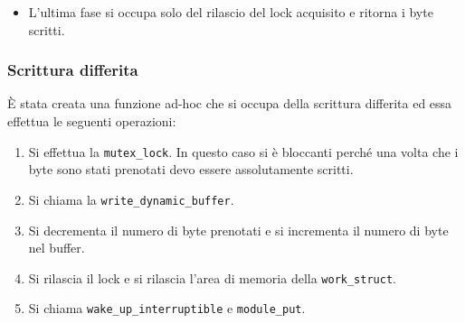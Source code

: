 \documentclass[oneside]{article}
\begin{document}
\begin{itemize}
\begin{itemize}
\begin{enumerate}
\item Viene incrementato il numero di byte nel buffer e viene invocata la \texttt{wake\_up\_interruptible}.
\end{enumerate}
\item Nel caso di \texttt{LOW PRIORITY}:
\begin{enumerate}
\item Si chiama la \texttt{try\_module\_get}.
\item Si collega solamente\footnote{Questo è un vantaggio in termini di performance perché all'interno della sezione critica si ha bisogno solamente di collegare il contenuto da scrivere alla struttura del deferred work.} il contenuto da scrivere al deferred work.
\item Si chiama \texttt{\_\_INIT\_WORK}.
\item Si incrementano i byte prenotati.
\item Si accoda il lavoro nella workqueue.
\end{enumerate}
\end{itemize}
\item L'ultima fase si occupa solo del rilascio del lock acquisito e ritorna i byte scritti.
\end{itemize}

\subsubsection{Scrittura differita}
È stata creata una funzione ad-hoc che si occupa della scrittura differita ed essa effettua le seguenti operazioni:
\begin{enumerate}
\item Si effettua la \texttt{mutex\_lock}. In questo caso si è bloccanti perché una volta che i byte sono stati prenotati devo essere assolutamente scritti.
\item Si chiama la \texttt{write\_dynamic\_buffer}.
\item Si decrementa il numero di byte prenotati e si incrementa il numero di byte nel buffer.
\item Si rilascia il lock e si rilascia l'area di memoria della \texttt{work\_struct}.
\item Si chiama \texttt{wake\_up\_interruptible} e \texttt{module\_put}.
\end{enumerate}
\end{document}
